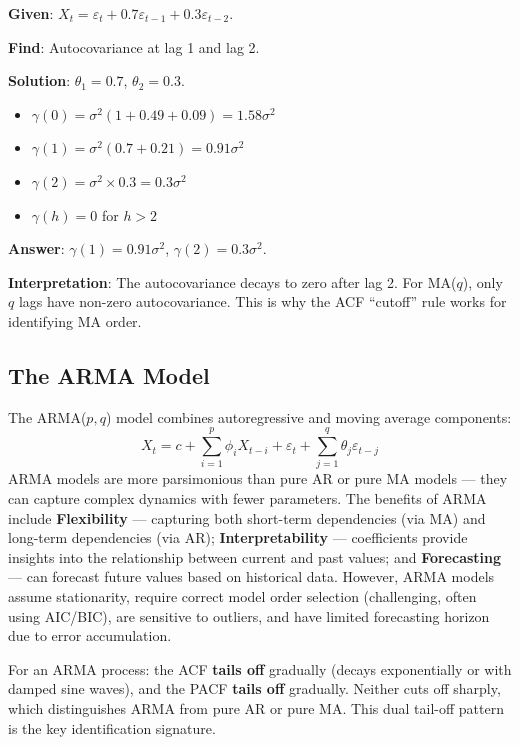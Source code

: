 \documentclass[11pt,a4paper]{article}
\begin{document}
\begin{tcolorbox}[colback=green!5!white,colframe=green!75!black,title=\textbf{Worked Example 5: MA(2) Autocovariance}]
\textbf{Given}: $X_t = \varepsilon_t + 0.7\varepsilon_{t-1} + 0.3\varepsilon_{t-2}$.

\textbf{Find}: Autocovariance at lag 1 and lag 2.

\textbf{Solution}: $\theta_1 = 0.7$, $\theta_2 = 0.3$.
\begin{itemize}
    \item $\gamma(0) = \sigma^2(1 + 0.49 + 0.09) = 1.58\sigma^2$
    \item $\gamma(1) = \sigma^2(0.7 + 0.21) = 0.91\sigma^2$
    \item $\gamma(2) = \sigma^2 \times 0.3 = 0.3\sigma^2$
    \item $\gamma(h) = 0$ for $h > 2$
\end{itemize}
\textbf{Answer}: $\gamma(1) = 0.91\sigma^2$, $\gamma(2) = 0.3\sigma^2$.

\textbf{Interpretation}: The autocovariance decays to zero after lag 2. For MA($q$), only $q$ lags have non-zero autocovariance. This is why the ACF ``cutoff'' rule works for identifying MA order.
\end{tcolorbox}


\subsection{The ARMA Model}

The ARMA($p, q$) model combines autoregressive and moving average components:
\[
X_t = c + \sum_{i=1}^p \phi_i X_{t-i} + \varepsilon_t + \sum_{j=1}^q \theta_j \varepsilon_{t-j}
\]
ARMA models are more parsimonious than pure AR or pure MA models --- they can capture complex dynamics with fewer parameters. The benefits of ARMA include \textbf{Flexibility} --- capturing both short-term dependencies (via MA) and long-term dependencies (via AR); \textbf{Interpretability} --- coefficients provide insights into the relationship between current and past values; and \textbf{Forecasting} --- can forecast future values based on historical data. However, ARMA models assume stationarity, require correct model order selection (challenging, often using AIC/BIC), are sensitive to outliers, and have limited forecasting horizon due to error accumulation.

For an ARMA process: the ACF \textbf{tails off} gradually (decays exponentially or with damped sine waves), and the PACF \textbf{tails off} gradually. Neither cuts off sharply, which distinguishes ARMA from pure AR or pure MA. This dual tail-off pattern is the key identification signature.
\end{document}
